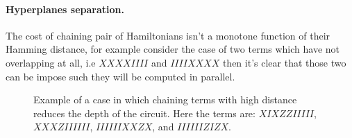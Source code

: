 \documentclass{article}
\begin{document}
\begin{multicols}{2}
\paragraph{Hyperplanes separation.} The cost of chaining pair of Hamiltonians isn't  a monotone function of their Hamming distance, for example consider the case of two terms which have not overlapping at all, i.e \( XXXXIIII \) and \(IIIIXXXX \) then it's clear that those two can be impose such they will be computed in parallel.   

\end{multicols}
\begin{figure*}[h]
  \centering
  
    \caption{ Example of a case in which chaining terms with high distance reduces the depth of the circuit. Here the terms are: \(XIXZZIIIII\), \(XXXZIIIIII\), \(IIIIIIXXZX\), and \(IIIIIIZIZX\). }
    \label{fig:average-data-vs-model}
\end{figure*}
\end{document}
